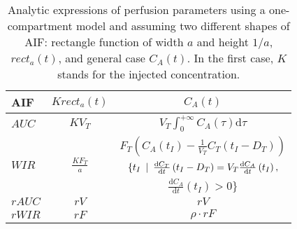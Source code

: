 \begin{table}[h!]
\begin{center}
\begin{tabular}{lcc}
\toprule
AIF & $K rect_a\left(t\right)$ & $C_A \left(t\right)$ \\
\midrule
\textbf{$AUC$} & $KV_T$ & $V_T \int_{0}^{+\infty}C_A\left(\tau\right)\mathrm d\tau$\\
\midrule
\multirow{3}{*}{\textbf{$WIR$}}
 & \multirow{3}{*}{{$\frac{KF_T}{a}$}} & $F_T\left(C_A\left(t_{I}\right)-\frac{1}{V_T}C_T\left(t_{I} - D_T\right)\right)$ \\
 & & $\{ t_{I} \enskip\vert\enskip \frac{\mathrm d C_T}{\mathrm dt}\left(t_{I} - D_T\right) = V_T \frac{\mathrm d C_A}{\mathrm dt}\left(t_{I}\right),$ \\
 & & $\frac{\mathrm d C_A}{\mathrm d t}\left(t_{I}\right) > 0\}$ \\
\midrule
\textbf{$rAUC$} & $rV$ & $rV$\\
\midrule
\textbf{$rWIR$} & $rF$ & $\rho \cdot rF$\\
\bottomrule
\end{tabular}
\caption{Analytic expressions of perfusion parameters using a one-compartment model and assuming two different shapes of AIF: rectangle function of width $a$ and height $1/a$, $rect_a(t)$, and general case $C_A(t)$. In the first case, $K$ stands for the injected concentration.}
\label{tab:AppAnalyticRelationAIF}
\end{center}
\end{table}
